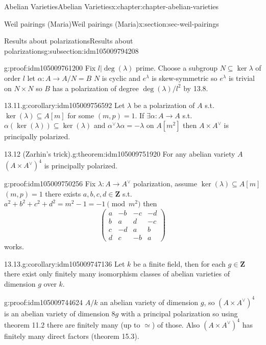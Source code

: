 \documentclass[oneside,10pt,]{book}
\numberwithin{equation}{section}
\newcommand{\lb}{[}
\newcommand{\rb}{]}
\newcommand{\ZZ}{\mathbf{Z}}
\newcommand{\amp}{&}
\begin{document}
\begin{chapterptx}{Abelian Varieties}{}{Abelian Varieties}{}{}{x:chapter:chapter-abelian-varieties}
\begin{sectionptx}{Weil pairings (Maria)}{}{Weil pairings (Maria)}{}{}{x:section:sec-weil-pairings}
\begin{subsectionptx}{Results about polarizations}{}{Results about polarizations}{}{}{g:subsection:idm105009794208}
\begin{proofptx}{}{g:proof:idm105009761200}
Fix \(l |\deg(\lambda)\) prime. Choose a subgroup \(N\subseteq \ker \lambda\) of order \(l\) let \(\alpha \colon A\to A/N = B\) \(N\) is cyclic and \(e^\lambda\) is skew-symmetric so \(e^{\lambda}\) is trivial on \(N\times N\) so \(B\) has a polarization of degree \(\deg(\lambda) / l^2\) by 13.8.%
\end{proofptx}
\begin{corollary}{13.11.}{}{g:corollary:idm105009756592}%
Let \(\lambda\) be a polarization of \(A\) s.t. \(\ker (\lambda) \subseteq A\lb m \rb\) for some \((m,p)=1\). If \(\exists \alpha \colon A \to A\) s.t. \(\alpha(\ker (\lambda)) \subseteq \ker(\lambda)\) and \(\alpha^\vee \lambda \alpha = - \lambda\) on \(A\lb m^2\rb\) then \(A\times A^\vee\) is principally polarized.%
\end{corollary}
\begin{theorem}{13.12 (Zarhin's trick).}{}{g:theorem:idm105009751920}%
For any abelian variety \(A\) \((A\times A^\vee)^4\) is principally polarized.%
\end{theorem}
\begin{proofptx}{}{g:proof:idm105009750256}
Fix \(\lambda \colon A\to A^\vee\) polarization, assume \(\ker (\lambda) \subseteq A\lb m \rb\) \((m, p) = 1\) there exists \(a,b,c,d \in \ZZ\) s.t. \(a^2 + b^2 + c^2 + d^2 = m^2  - 1 = -1 \pmod {m^2}\) then%
\begin{equation*}
\begin{pmatrix} a\amp -b \amp-c\amp -d \\ b\amp a \amp d \amp -c \\ c\amp -d \amp a \amp b \\ d \amp c \amp -b \amp a\end{pmatrix}
\end{equation*}
works.%
\end{proofptx}
\begin{corollary}{13.13.}{}{g:corollary:idm105009747136}%
Let \(k\) be a finite field, then for each \(g \in \ZZ\) there exist only finitely many isomorphism classes of abelian varieties of dimension \(g\) over \(k\).%
\end{corollary}
\begin{proofptx}{}{g:proof:idm105009744624}
\(A/k\) an abelian variety of dimension \(g\), so \((A\times A^\vee)^4\) is an abelian variety of dimension \(8g\) with a principal polarization so using theorem 11.2 there are finitely many (up to \(\simeq\)) of those. Also \((A\times A^\vee)^4\) has finitely many direct factors (theorem 15.3).%
\end{proofptx}

\end{subsectionptx}
\end{sectionptx}
\end{chapterptx}
\end{document}

